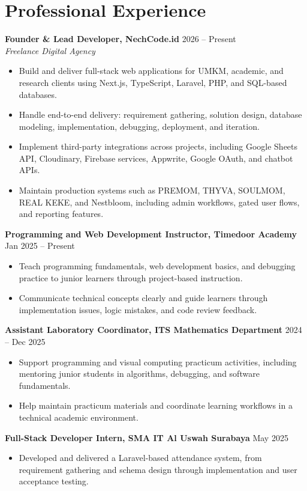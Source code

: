 \documentclass[a4paper,11pt]{article}
\begin{document}
\section*{Professional Experience}
\textbf{Founder \& Lead Developer, NechCode.id} \hfill 2026 -- Present \\
\textit{Freelance Digital Agency}
\begin{itemize}
  \item Build and deliver full-stack web applications for UMKM, academic, and research clients using Next.js, TypeScript, Laravel, PHP, and SQL-based databases.
  \item Handle end-to-end delivery: requirement gathering, solution design, database modeling, implementation, debugging, deployment, and iteration.
  \item Implement third-party integrations across projects, including Google Sheets API, Cloudinary, Firebase services, Appwrite, Google OAuth, and chatbot APIs.
  \item Maintain production systems such as PREMOM, THYVA, SOULMOM, REAL KEKE, and Nestbloom, including admin workflows, gated user flows, and reporting features.
\end{itemize}

\textbf{Programming and Web Development Instructor, Timedoor Academy} \hfill Jan 2025 -- Present
\begin{itemize}
  \item Teach programming fundamentals, web development basics, and debugging practice to junior learners through project-based instruction.
  \item Communicate technical concepts clearly and guide learners through implementation issues, logic mistakes, and code review feedback.
\end{itemize}

\textbf{Assistant Laboratory Coordinator, ITS Mathematics Department} \hfill 2024 -- Dec 2025
\begin{itemize}
  \item Support programming and visual computing practicum activities, including mentoring junior students in algorithms, debugging, and software fundamentals.
  \item Help maintain practicum materials and coordinate learning workflows in a technical academic environment.
\end{itemize}

\textbf{Full-Stack Developer Intern, SMA IT Al Uswah Surabaya} \hfill May 2025
\begin{itemize}
  \item Developed and delivered a Laravel-based attendance system, from requirement gathering and schema design through implementation and user acceptance testing.
\end{itemize}
\end{document}
